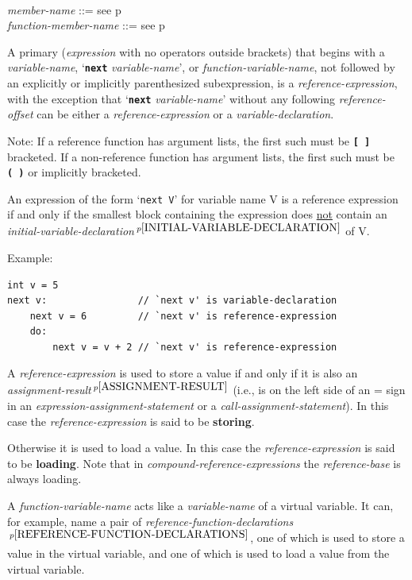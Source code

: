 \documentclass[12pt]{article}
\newcommand{\TT}[1]{{\tt \bfseries #1}}
\newcommand{\key}[1]{{\rm \bfseries #1}}
\newcommand{\pagref}[1]{p\pageref{#1}}
\newcommand{\pagnote}[1]{$\,^{p\pageref{#1}}$}
\newenvironment{indpar}[1][0.3in]%
	{\begin{list}{}%
		     {\setlength{\itemsep}{0in}%
		      \setlength{\topsep}{0in}%
		      \setlength{\parsep}{1ex}%
		      \setlength{\labelwidth}{#1}%
		      \setlength{\leftmargin}{#1}%
		      \addtolength{\leftmargin}{\labelsep}}%
	 \item}%
	{\end{list}}
\begin{document}
\begin{indpar}
\\[0.5ex]
{\em member-name} ::= see \pagref{MEMBER-NAME}
\\[0.5ex]
{\em function-member-name} ::= see \pagref{FUNCTION-MEMBER-NAME}
\begin{enumerate}
\item
A primary ({\em expression} with no operators outside brackets) that begins
with a {\em variable-name}, `\TT{next} {\em vari\-able-name}',
or {\em function-variable-name},
not followed
by an explicitly or implicitly parenthesized subexpression,
is a {\em reference-expression}, with the exception that
`\TT{next} {\em vari\-able-name}' without any following {\em reference-offset}
can be either a {\em reference-expression}
or a {\em variable-declaration}.

Note: If a reference function has argument lists, the first such must
be \TT{[~]} bracketed.  If a non-reference function has argument lists,
the first such must be \TT{(~)} or implicitly bracketed.

\item
An expression of the form `{\tt next V}' for variable name V is a
reference expression if and only if the smallest block containing
the expression does \underline{not} contain an
{\em initial-variable-declaration}\pagnote{INITIAL-VARIABLE-DECLARATION}
of V.

Example:

\begin{indpar}\begin{verbatim}
int v = 5
next v:                // `next v' is variable-declaration
    next v = 6         // `next v' is reference-expression
    do:
        next v = v + 2 // `next v' is reference-expression
\end{verbatim}\end{indpar}

\item \label{STORING-REFERENCE-FUNCTION}
A {\em reference-expression} is used to store a value if and only
if it is also an {\em assignment-result}\pagnote{ASSIGNMENT-RESULT}
(i.e., is on the left side of an = sign in
an {\em expression-assignment-statement} or
a {\em call-assignment-statement}).
In this case the {\em reference-expression} is said to be \key{storing}.

Otherwise it is used to load a value.
In this case the {\em reference-expression} is said to be \key{loading}.
Note that in {\em compound-reference-expressions} the {\em reference-base}
is always loading.
\item
A {\em function-variable-name} acts like a {\em variable-name}
of a virtual variable.  It can, for example, name a pair of
{\em reference-function-declarations}\pagnote{REFERENCE-FUNCTION-DECLARATIONS},
one of which is used to store a value
in the virtual variable, and one of which is used to load a
value from the virtual variable.


\end{enumerate}
\end{indpar}
\end{document}
